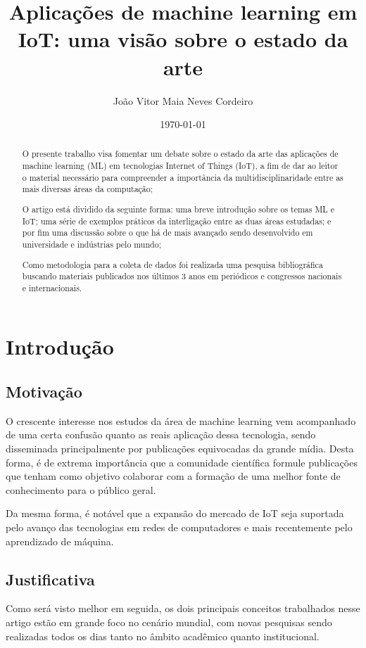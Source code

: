 \documentclass[12pt]{article}
\author{João Vitor Maia Neves Cordeiro}
\title{Aplicações de machine learning em IoT: uma visão sobre o estado da arte}
\date{\today}
\begin{document}
\maketitle

\begin{abstract}
O presente trabalho visa fomentar um debate sobre o estado da arte das aplicações de machine learning (ML) em tecnologias Internet of Things (IoT), a fim de dar ao leitor o material necessário para compreender a importância da multidisciplinaridade entre as mais diversas áreas da computação;

O artigo está dividido da seguinte forma: uma breve introdução sobre os temas ML e IoT; uma série de exemplos práticos da interligação entre as duas áreas estudadas; e por fim uma discussão sobre o que há de mais avançado sendo desenvolvido em universidade e indústrias pelo mundo;

Como metodologia para a coleta de dados foi realizada uma pesquisa bibliográfica buscando materiais publicados nos últimos 3 anos em periódicos e congressos nacionais e internacionais.
\end{abstract}

\section{Introdução}

\subsection{Motivação}

O crescente interesse nos estudos da área de machine learning vem acompanhado de uma certa confusão quanto as reais aplicação dessa tecnologia, sendo disseminada principalmente por publicações equivocadas da grande mídia. Desta forma, é de extrema importância que a comunidade científica formule publicações que tenham como objetivo colaborar com a formação de uma melhor fonte de conhecimento para o público geral.

Da mesma forma, é notável que a expansão do mercado de IoT seja suportada pelo avanço das tecnologias em redes de computadores e mais recentemente pelo aprendizado de máquina.

\subsection{Justificativa}

Como será visto melhor em seguida, os dois principais conceitos trabalhados nesse artigo estão em grande foco no cenário mundial, com novas pesquisas sendo realizadas todos os dias tanto no âmbito acadêmico quanto institucional.
\end{document}
